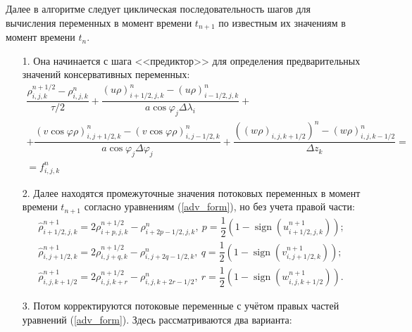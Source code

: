 \documentclass[14pt, a4paper]{extarticle}
\newcommand{\sign}{\operatorname{sign}}
\begin{document}
Далее в алгоритме следует циклическая последовательность шагов для вычисления переменных в момент времени $t_{n+1}$ по известным их значениям в момент времени $t_n$. 
\begin{itemize}
\item[1.] Она начинается с шага <<предиктор>> для определения предварительных значений консервативных переменных: \begin{gather} 
\dfrac{\rho_{i,j,k}^{n+1/2}-\rho_{i,j,k}^n}{\tau/2}+\dfrac{(u\rho)_{i+1/2, j,k}^n-(u\rho)_{i-1/2, j,k}^n}{a\cos\varphi_j \Delta \lambda_i} +\nonumber\\+\dfrac{(v\cos\varphi \rho)_{i,j+1/2,k}^n-(v\cos\varphi \rho)_{i,j-1/2,k}^n}{a\cos\varphi_j \Delta\varphi_j}+ \dfrac{((w\rho)_{i,j,k+1/2})^n-(w\rho)_{i,j,k-1/2}^n}{\Delta z_k} =\nonumber \\=f_{i,j,k}^n \label{predictor}
\end{gather}

\item[2.] Далее находятся промежуточные значения потоковых переменных в момент времени $t_{n+1}$ согласно уравнениям (\ref{adv_form}), но без учета правой части:
\begin{gather}
\hat{\rho}_{i+1/2, j, k}^{n+1} = 2\rho_{i+p, j, k}^{n+1/2} - \rho_{i+2p-1/2, j, k}^n, \ p = \dfrac{1}{2}\left(1-\sign\left(u_{i+1/2, j, k}^{n+1}\right)\right);\nonumber\\
\hat{\rho}_{i, j+1/2, k}^{n+1} = 2\rho_{i, j+q, k}^{n+1/2} - \rho_{i, j+2q-1/2, k}^n, \ q = \dfrac{1}{2}\left(1-\sign\left(v_{i, j+1/2, k}^{n+1}\right)\right);\\
\hat{\rho}_{i, j, k+1/2}^{n+1} = 2\rho_{i, j, k+r}^{n+1/2} - \rho_{i, j, k+2r-1/2}^n, \ r = \dfrac{1}{2}\left(1-\sign\left(w_{i, j, k+1/2}^{n+1}\right)\right).\nonumber
\end{gather}


\item[3.] Потом корректируются потоковые переменные с учётом правых частей уравнений (\ref{adv_form}). Здесь рассматриваются два варианта: 


\end{itemize}
\end{document}
